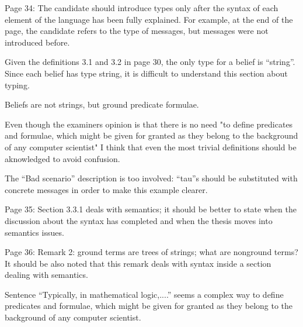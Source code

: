 \documentclass{article}
\newcommand{\todo}[1]{[\textcolor{red}{TODO}: #1]}
\newenvironment{them}{\noindent\begingroup\color{blue}}{\endgroup\par}
\begin{document}
\begin{them}

Page 34:
The candidate should introduce types only after the syntax of each element of
the language has been fully explained. For example, at the end of the page, the
candidate refers to the type of messages, but messages were not introduced
before.

\end{them}
\todo{}

\begin{them}

Given the definitions 3.1 and 3.2 in page 30, the only type for a belief is
“string”. Since each belief has type string, it is difficult to understand this
section about typing.

\end{them}
Beliefs are not strings, but ground predicate formulae.

Even though the examiners opinion is that there is no need "to define
predicates and formulae, which might be given for granted as they belong to the
background of any computer scientist" I think that even the most trivial
definitions should be aknowledged to avoid confusion. 

\begin{them}

The “Bad scenario” description is too involved: “tau”s should be substituted
with concrete messages in order to make this example clearer.

\end{them}
\todo{}

\begin{them}

Page 35:
Section 3.3.1 deals with semantics; it should be better to state when the
discussion about the syntax has completed and when the thesis moves into
semantics issues.

\end{them}
\todo{?}

\begin{them}

Page 36:
Remark 2: ground terms are trees of strings; what are nonground terms? It
should be also noted that this remark deals with syntax inside a section
dealing with semantics.

\end{them}
\todo{?}

\begin{them}

Sentence “Typically, in mathematical logic,....” seems a complex way to define
predicates and formulae, which might be given for granted as they belong to the
background of any computer scientist.

\end{them}
\todo{?}
\end{document}
